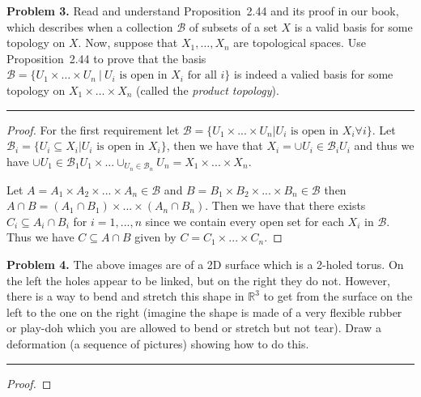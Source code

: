 \documentclass[leqno]{article}
\theoremstyle{nonumberplain}
\newtheorem{proof}{Proof}
\newcommand{\R}{\ensuremath{\mathbb{R}}}
\newcommand{\cB}{\ensuremath{\mathcal{B}}}
\begin{document}
\pagebreak




\noindent\textbf{Problem 3.} Read and understand Proposition~2.44 and its proof in our book, which describes when a collection $\cB$ of subsets of a set $X$ is a valid basis for some topology on $X$. Now, suppose that $X_1,\ldots,X_n$ are topological spaces. Use Proposition~2.44 to prove that the basis $\cB=\{U_1\times\ldots\times U_n~|~U_i\mbox{ is open in }X_i\mbox{ for all }i\}$ is indeed a valied basis for some topology on $X_1\times\ldots\times X_n$ (called the \emph{product topology}).

\noindent\rule[0.5ex]{\linewidth}{1pt}

\begin{proof}
For the first requirement let $\mathcal{B}=\{U_1\times ... \times U_n \vert U_i \textrm{ is open in } X_i \forall i\}$. Let $\mathcal{B}_i=\{U_i \subseteq X_i \vert U_i \textrm{ is open in } X_i\}$, then we have that $X_i=\cup{U_i \in \mathcal{B}_i} U_i$ and thus we have $\cup{U_1\in \mathcal{B}_1}U_1 \times ... \cup_{U_n\in \mathcal{B}_n}U_n=X_1\times ...\times X_n$. 

Let $A=A_1\times A_2 \times ... \times A_n \in \mathcal{B}$  and $B=B_1\times B_2 \times ... \times B_n \in \mathcal{B}$ then $A\cap B = (A_1\cap B_1)\times ... \times (A_n \cap B_n)$. Then we have that there exists $C_i \subseteq A_i\cap B_i$ for $i=1,...,n$ since we contain every open set for each $X_i$ in $\mathcal{B}$. Thus we have $C\subseteq A\cap B$ given by $C=C_1\times ... \times C_n$.
\end{proof}

\pagebreak





\noindent\textbf{Problem 4.}  The above images are of a 2D surface which is a 2-holed torus. On the left the holes appear to be linked, but on the right they do not. However, there is a way to bend and stretch this shape in $\R^3$ to get from the surface on the left to the one on the right (imagine the shape is made of a very flexible rubber or play-doh which you are allowed to bend or stretch but not tear). Draw a deformation (a sequence of pictures) showing how to do this.

\noindent\rule[0.5ex]{\linewidth}{1pt}

\begin{proof}

\end{proof}


\pagebreak
\end{document}
